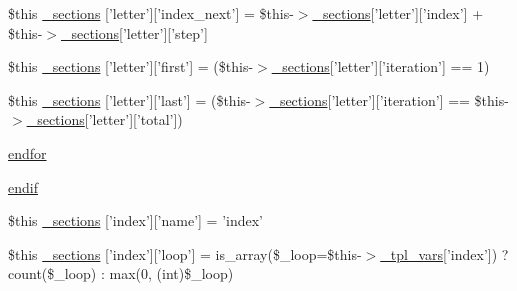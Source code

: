 \begin{DoxyCompactItemize}
\item 
\$this \hyperlink{media_234d6fa4bfd5eef6424a9ddc74a166350_2_06_06-19_05_06_06-1910644431_05basicindex_8tpl_8php_a4debc053dc2f3efa7fea6f04fa91cd0f}{\-\_\-sections} \mbox{[}'letter'\mbox{]}\mbox{[}'index\-\_\-next'\mbox{]} = \$this-\/$>$\hyperlink{_06_06127_05_06_0612781687_05pkgelementindex_8tpl_8php_a9e3d26b39edfe29c3f29b8035ef33828}{\-\_\-sections}\mbox{[}'letter'\mbox{]}\mbox{[}'index'\mbox{]} + \$this-\/$>$\hyperlink{_06_06127_05_06_0612781687_05pkgelementindex_8tpl_8php_a9e3d26b39edfe29c3f29b8035ef33828}{\-\_\-sections}\mbox{[}'letter'\mbox{]}\mbox{[}'step'\mbox{]}
\item 
\$this \hyperlink{media_234d6fa4bfd5eef6424a9ddc74a166350_2_06_06-19_05_06_06-1910644431_05basicindex_8tpl_8php_ab9d257a2015bf9499601c3f9461e868e}{\-\_\-sections} \mbox{[}'letter'\mbox{]}\mbox{[}'first'\mbox{]} = (\$this-\/$>$\hyperlink{_06_06127_05_06_0612781687_05pkgelementindex_8tpl_8php_a9e3d26b39edfe29c3f29b8035ef33828}{\-\_\-sections}\mbox{[}'letter'\mbox{]}\mbox{[}'iteration'\mbox{]} == 1)
\item 
\$this \hyperlink{media_234d6fa4bfd5eef6424a9ddc74a166350_2_06_06-19_05_06_06-1910644431_05basicindex_8tpl_8php_ad687d1fc356ce0cf84c4217e60ae2a1d}{\-\_\-sections} \mbox{[}'letter'\mbox{]}\mbox{[}'last'\mbox{]} = (\$this-\/$>$\hyperlink{_06_06127_05_06_0612781687_05pkgelementindex_8tpl_8php_a9e3d26b39edfe29c3f29b8035ef33828}{\-\_\-sections}\mbox{[}'letter'\mbox{]}\mbox{[}'iteration'\mbox{]} == \$this-\/$>$\hyperlink{_06_06127_05_06_0612781687_05pkgelementindex_8tpl_8php_a9e3d26b39edfe29c3f29b8035ef33828}{\-\_\-sections}\mbox{[}'letter'\mbox{]}\mbox{[}'total'\mbox{]})
\item 
\hyperlink{media_234d6fa4bfd5eef6424a9ddc74a166350_2_06_06-19_05_06_06-1910644431_05basicindex_8tpl_8php_ae8fdc27183f296411bac00ed522ee1ac}{endfor}
\item 
\hyperlink{media_234d6fa4bfd5eef6424a9ddc74a166350_2_06_06-19_05_06_06-1910644431_05basicindex_8tpl_8php_a82cd33ca97ff99f2fcc5e9c81d65251b}{endif}
\item 
\$this \hyperlink{media_234d6fa4bfd5eef6424a9ddc74a166350_2_06_06-19_05_06_06-1910644431_05basicindex_8tpl_8php_a4be17fc57e77c382f51f873fc85f607c}{\-\_\-sections} \mbox{[}'index'\mbox{]}\mbox{[}'name'\mbox{]} = 'index'
\item 
\$this \hyperlink{media_234d6fa4bfd5eef6424a9ddc74a166350_2_06_06-19_05_06_06-1910644431_05basicindex_8tpl_8php_a75ddf704ebb80010a1e7d184b4be4b4e}{\-\_\-sections} \mbox{[}'index'\mbox{]}\mbox{[}'loop'\mbox{]} = is\-\_\-array(\$\-\_\-loop=\$this-\/$>$\hyperlink{_06_06127_05_06_0612781687_05pkgelementindex_8tpl_8php_a4a4846d8e68d455590131a05697f67a3}{\-\_\-tpl\-\_\-vars}\mbox{[}'index'\mbox{]}) ? count(\$\-\_\-loop) \-: max(0, (int)\$\-\_\-loop)

\end{DoxyCompactItemize}
